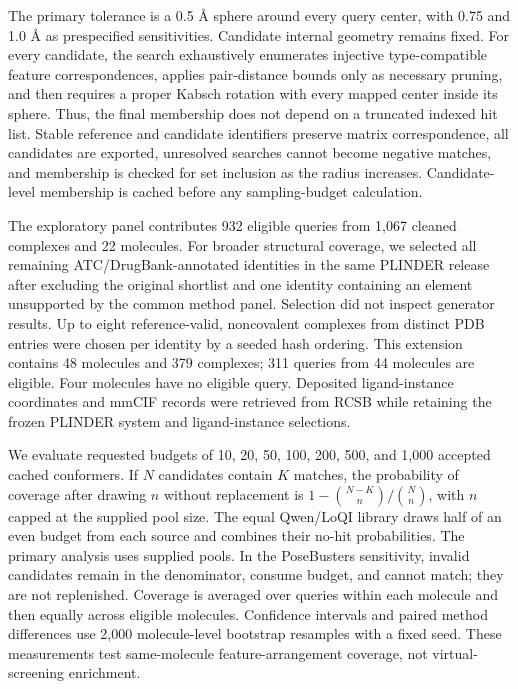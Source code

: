 The primary tolerance is a 0.5 \AA{} sphere around every query center, with 0.75 and
1.0 \AA{} as prespecified sensitivities. Candidate internal geometry remains fixed.
For every candidate, the search exhaustively enumerates injective type-compatible
feature correspondences, applies pair-distance bounds only as necessary pruning, and
then requires a proper Kabsch rotation with every mapped center inside its sphere.
Thus, the final membership does not depend on a truncated indexed hit list. Stable
reference and candidate identifiers preserve matrix correspondence, all candidates
are exported, unresolved searches cannot become negative matches, and membership is
checked for set inclusion as the radius increases. Candidate-level membership is
cached before any sampling-budget calculation.

The exploratory panel contributes 932 eligible queries from 1,067 cleaned complexes
and 22 molecules. For broader structural coverage, we selected all remaining
ATC/DrugBank-annotated identities in the same PLINDER release after excluding the
original shortlist and one identity containing an element unsupported by the common
method panel. Selection did not inspect generator results. Up to eight reference-valid,
noncovalent complexes from distinct PDB entries were chosen per identity by a seeded
hash ordering. This extension contains 48 molecules and 379 complexes; 311 queries
from 44 molecules are eligible. Four molecules have no eligible query. Deposited
ligand-instance coordinates and mmCIF records were retrieved from RCSB while retaining
the frozen PLINDER system and ligand-instance selections.

We evaluate requested budgets of 10, 20, 50, 100, 200, 500, and 1,000 accepted cached
conformers. If $N$ candidates contain $K$ matches, the probability of coverage after
drawing $n$ without replacement is
\(1-\binom{N-K}{n}/\binom{N}{n}\), with $n$ capped at the supplied pool size. The
equal Qwen/LoQI library draws half of an even budget from each source and combines
their no-hit probabilities. The primary analysis uses supplied pools. In the
PoseBusters sensitivity, invalid candidates remain in the denominator, consume budget,
and cannot match; they are not replenished. Coverage is averaged over queries within
each molecule and then equally across eligible molecules. Confidence intervals and
paired method differences use 2,000 molecule-level bootstrap resamples with a fixed
seed. These measurements test same-molecule feature-arrangement coverage, not
virtual-screening enrichment.

